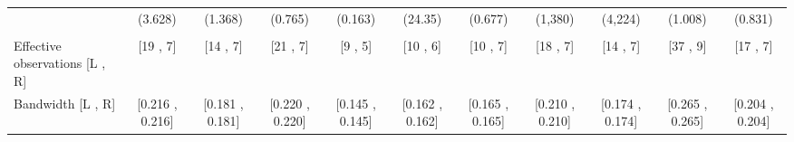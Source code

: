 \begin{tabular}{lcccccccccc}
      & (3.628) & (1.368) & (0.765) & (0.163) & (24.35) & (0.677) & (1,380) & (4,224) & (1.008) & (0.831) \\
      &       &       &       &       &       &       &       &       &       &  \\
\midrule
Effective observations [L , R] & [19 , 7] & [14 , 7] & [21 , 7] & [9 , 5] & [10 , 6] & [10 , 7] & [18 , 7] & [14 , 7] & [37 , 9] & [17 , 7] \\
Bandwidth [L , R] & [0.216 , 0.216] & [0.181 , 0.181] & [0.220 , 0.220] & [0.145 , 0.145] & [0.162 , 0.162] & [0.165 , 0.165] & [0.210 , 0.210] & [0.174 , 0.174] & [0.265 , 0.265] & [0.204 , 0.204] \\
\bottomrule
\bottomrule
\end{tabular}%
